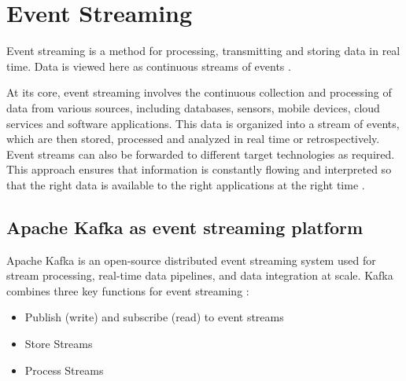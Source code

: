 \section{Event Streaming}
\label{cha:event-streaming}

Event streaming is a method for processing, transmitting and storing data in real time. Data is viewed here as continuous streams of events \cite{barga2006consistent}.

At its core, event streaming involves the continuous collection and processing of data from various sources, including databases, sensors, mobile devices, cloud services and software applications. This data is organized into a stream of events, which are then stored, processed and analyzed in real time or retrospectively. Event streams can also be forwarded to different target technologies as required. This approach ensures that information is constantly flowing and interpreted so that the right data is available to the right applications at the right time \cite{kafkaDoc}.

\subsection{Apache Kafka as event streaming platform}

Apache Kafka is an open-source distributed event streaming system used for stream processing, real-time data pipelines, and data integration at scale. Kafka combines three key functions for event streaming \cite{kafkaDoc}:

\begin{itemize}
    \item Publish (write) and subscribe (read) to event streams 
    \item Store Streams
    \item Process Streams
\end{itemize}